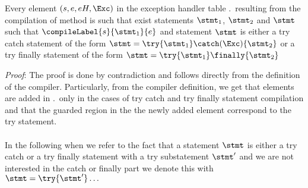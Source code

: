  \begin{compPropApp}\label{compile:prop:compProp7}
    Every element  $ (s,e, eH, \Exc )$  in the exception handler table \methodd.\excHandlerTable  \
    resulting from the compilation of method \methodd{}
    is such that exist statements $\stmt_1$, $\stmt_2$  and $\stmt$  such that $\compileLabel{s}{\stmt_1}{e}$
    and  statement $\stmt$ is either a try catch statement of the form 
    $\stmt = \try \{ \stmt_1 \} \catch ( \Exc )  \{ \stmt_2 \} $ or a try finally statement of the form 
    $\stmt = \try \{ \stmt_1 \} \finally \{ \stmt_2 \} $
\end{compPropApp} 
\textit{Proof}:
The proof is done by contradiction and follows directly from the definition of the compiler. 
 Particularly, from the compiler definition, we get that  elements are added in 
 \methodd.\excHandlerTable \ only in the cases of 
try catch and try finally statement compilation and that the guarded region in the  the newly added element
 correspond to the try  statement. \\
\Qed\\
In the following when we refer to the fact that a statement  $\stmt$  is either a try catch or a try finally statement with 
a try substatement $\stmt'$ and we 
are not interested in the catch or  finally  part we denote this with  $\stmt = \try{\stmt'} \ldots$





